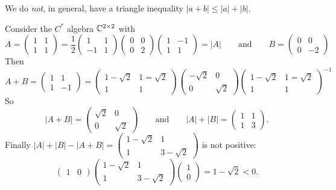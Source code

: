 We do \emph{not}, in general, have a triangle inequality $|a+b| \leq |a| + |b|$.
\begin{example}
Consider the $C^*$ algebra $\mathbb{C}^{2\times 2}$ with
\[ A = \begin{pmatrix}
1 & 1 \\ 1 & 1
\end{pmatrix} = \frac{1}{2}\begin{pmatrix}
1 & 1 \\ -1 & 1
\end{pmatrix}\begin{pmatrix}
0 & 0 \\ 0 & 2
\end{pmatrix}\begin{pmatrix}
1 & -1 \\ 1 & 1
\end{pmatrix} = |A| \qquad\text{and}\qquad B = \begin{pmatrix}
0 & 0 \\ 0 & -2
\end{pmatrix} \]
Then
\[ A + B = \begin{pmatrix}
1 & 1 \\ 1 & -1
\end{pmatrix} = \begin{pmatrix}
1-\sqrt{2} & 1=\sqrt{2} \\ 1 & 1
\end{pmatrix}\begin{pmatrix}
-\sqrt{2} & 0 \\ 0 & \sqrt{2}
\end{pmatrix}\begin{pmatrix}
1-\sqrt{2} & 1=\sqrt{2} \\ 1 & 1
\end{pmatrix}^{-1} \]
So
\[ |A+B| = \begin{pmatrix}
\sqrt{2} & 0 \\ 0 & \sqrt{2}
\end{pmatrix} \qquad\text{and}\qquad |A| + |B| = \begin{pmatrix}
1 & 1 \\ 1 & 3
\end{pmatrix}. \]
Finally $|A| + |B| - |A+B| = \begin{pmatrix}
1 - \sqrt{2} & 1 \\ 1 & 3-\sqrt{2}
\end{pmatrix}$ is not positive:
\[ \begin{pmatrix}
1 & 0
\end{pmatrix}\begin{pmatrix}
1 - \sqrt{2} & 1 \\ 1 & 3-\sqrt{2}
\end{pmatrix}\begin{pmatrix}
1 \\ 0
\end{pmatrix} = 1-\sqrt{2} < 0. \]
\end{example}

